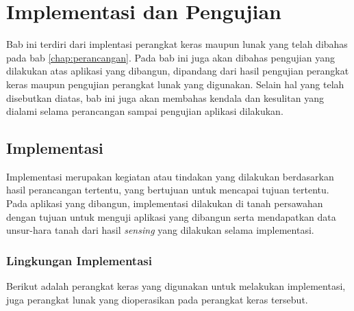\chapter{Implementasi dan Pengujian}
\label{chap:implementasi dan pengujian}

\def\scl{1}
\def\leg{} 
\def\std{none}
\def\ymin{}
\def\ymax{}

Bab ini terdiri dari implentasi perangkat keras maupun lunak yang telah dibahas pada bab \ref{chap:perancangan}. Pada bab ini juga akan dibahas pengujian yang dilakukan atas aplikasi yang dibangun, dipandang dari hasil pengujian perangkat keras maupun pengujian perangkat lunak yang digunakan. Selain hal yang telah disebutkan diatas, bab ini juga akan membahas kendala dan kesulitan yang dialami selama perancangan sampai pengujian aplikasi dilakukan. 

\section{Implementasi}
\label{sec:skripsi} 
    Implementasi merupakan kegiatan atau tindakan yang dilakukan berdasarkan hasil perancangan tertentu, yang bertujuan untuk mencapai tujuan tertentu. Pada aplikasi yang dibangun, implementasi dilakukan di tanah persawahan dengan tujuan untuk menguji aplikasi yang dibangun serta mendapatkan data unsur-hara tanah dari hasil \textit{sensing} yang dilakukan selama implementasi.

   \subsection{Lingkungan Implementasi}
   Berikut adalah perangkat keras yang digunakan untuk melakukan implementasi, juga perangkat lunak yang dioperasikan pada perangkat keras tersebut.
   
